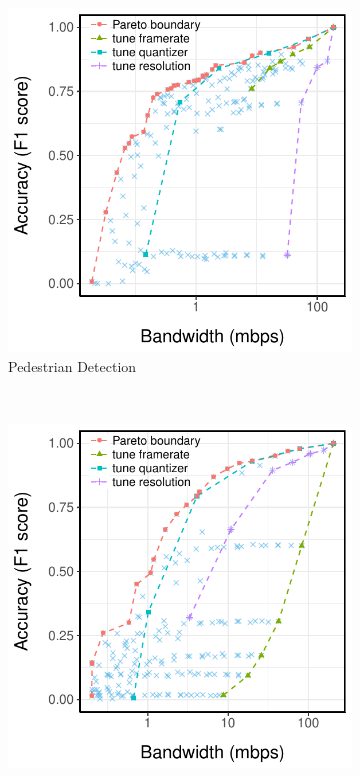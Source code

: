 \begin{figure}
  \centering
  \begin{subfigure}[t]{0.33\textwidth}
    \centering
    \includegraphics[width=\textwidth]{figures/ped-profile.pdf}
    \caption{Pedestrian Detection}
    \label{fig:pd-profile}
  \end{subfigure}
  ~
  \begin{subfigure}[t]{0.33\textwidth}
    \centering
    \includegraphics[width=\textwidth]{figures/darknet-profile.pdf}

\end{subfigure}
\end{figure}
